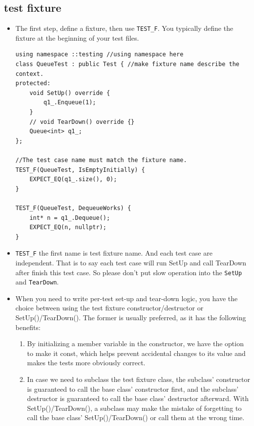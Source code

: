 \documentclass[a4paper,11pt,twoside]{book}
\begin{document}
\subsection{test fixture}
\begin{itemize}
	\item The first step, define a fixture, then use \texttt{TEST\_F}. You typically define the fixture at the beginning of your test files.
\begin{lstlisting}
using namespace ::testing //using namespace here
class QueueTest : public Test { //make fixture name describe the context.
protected:
	void SetUp() override {
		q1_.Enqueue(1);
	}
	// void TearDown() override {}
	Queue<int> q1_;
};

//The test case name must match the fixture name.
TEST_F(QueueTest, IsEmptyInitially) {
	EXPECT_EQ(q1_.size(), 0);
}

TEST_F(QueueTest, DequeueWorks) {
	int* n = q1_.Dequeue();
	EXPECT_EQ(n, nullptr);
}
\end{lstlisting}

	\item \texttt{TEST\_F} the first name is test fixture name. And each test case are independent. That is to say each test case will run SetUp and call TearDown after finish this test case. So please don't put slow operation into the \texttt{SetUp} and \texttt{TearDown}.

	\item When you need to write per-test set-up and tear-down logic, you have the choice between using the test fixture constructor/destructor or SetUp()/TearDown(). The former is usually preferred, as it has the following benefits:
\begin{enumerate}
	\item By initializing a member variable in the constructor, we have the option to make it const, which helps prevent accidental changes to its value and makes the tests more obviously correct.
	
	\item In case we need to subclass the test fixture class, the subclass' constructor is guaranteed to call the base class' constructor first, and the subclass' destructor is guaranteed to call the base class' destructor afterward. With SetUp()/TearDown(), a subclass may make the mistake of forgetting to call the base class' SetUp()/TearDown() or call them at the wrong time.
\end{enumerate}

\end{itemize}
\end{document}
